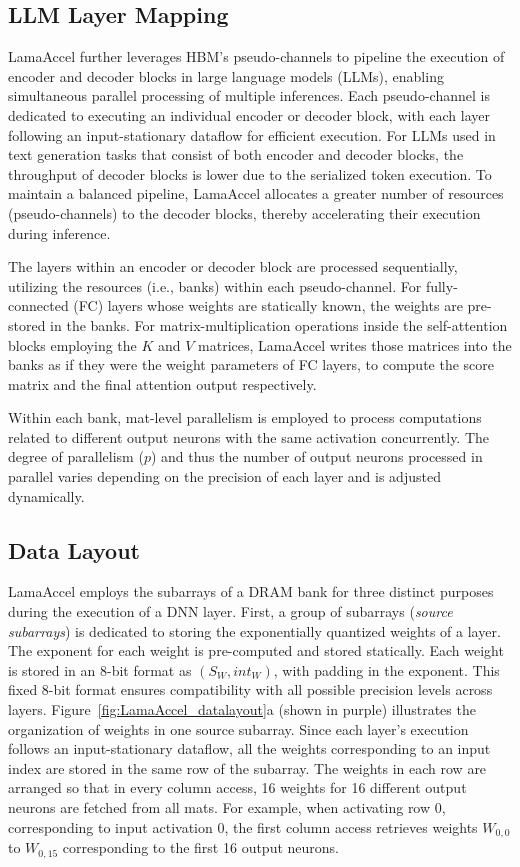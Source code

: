 \subsection{LLM Layer Mapping}
LamaAccel further leverages HBM's pseudo-channels to pipeline the execution of encoder and decoder blocks in large language models (LLMs), enabling simultaneous parallel processing of multiple inferences. Each pseudo-channel is dedicated to executing an individual encoder or decoder block, with each layer following an input-stationary dataflow for efficient execution. For LLMs used in text generation tasks that consist of both encoder and decoder blocks, the throughput of decoder blocks is lower due to the serialized token execution. To maintain a balanced pipeline, LamaAccel allocates a greater number of resources (pseudo-channels) to the decoder blocks, thereby accelerating their execution during inference.

The layers within an encoder or decoder block are processed sequentially, utilizing the resources (i.e., banks) within each pseudo-channel. For fully-connected (FC) layers whose weights are statically known, the weights are pre-stored in the banks. For matrix-multiplication operations inside the self-attention blocks employing the $K$ and $V$ matrices, LamaAccel writes those matrices into the banks as if they were the weight parameters of FC layers, to compute the score matrix and the final attention output respectively.

Within each bank, mat-level parallelism is employed to process computations related to different output neurons with the same activation concurrently. The degree of parallelism ($p$) and thus the number of output neurons processed in parallel varies depending on the precision of each layer and is adjusted dynamically.

\subsection{Data Layout}\label{data_layout_casestudy2}
LamaAccel employs the subarrays of a DRAM bank for three distinct purposes during the execution of a DNN layer. First, a group of subarrays (\textit{source subarrays}) is dedicated to storing the exponentially quantized weights of a layer. The exponent for each weight is pre-computed and stored statically. Each weight is stored in an 8-bit format as $(S_{W}, int_{W})$, with padding in the exponent. This fixed 8-bit format ensures compatibility with all possible precision levels across layers. Figure~\ref{fig:LamaAccel_datalayout}a (shown in purple) illustrates the organization of weights in one source subarray. Since each layer's execution follows an input-stationary dataflow, all the weights corresponding to an input index are stored in the same row of the subarray. The weights in each row are arranged so that in every column access, 16 weights for 16 different output neurons are fetched from all mats. For example, when activating row 0, corresponding to input activation 0, the first column access retrieves weights $W_{0,0}$ to $W_{0,15}$ corresponding to the first 16 output neurons.

